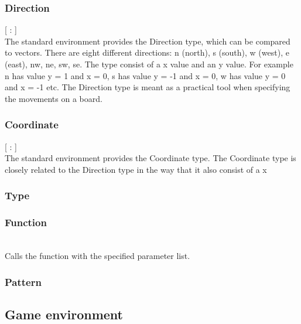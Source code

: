 \subsubsection{Direction}
\begin{dlist}
  \item {}[ : ]\\
  The standard environment provides the Direction type, which can be compared to vectors. There are eight different directions: n (north), s (south), w (west), e (east), nw, ne, sw, se. The type consist of a x value and an y value. For example n has value y = 1 and x = 0, s has value y = -1 and x = 0, w has value y = 0 and x = -1 etc. The Direction type is meant as a practical tool when specifying the movements on a board.  
\end{dlist}

\subsubsection{Coordinate}
\begin{dlist}
  \item {}[ : ]\\
  The standard environment provides the Coordinate type. The Coordinate type is closely related to the Direction type in the way that it also consist of a x 
\end{dlist}
\subsubsection{Type}

\subsubsection{Function}

\begin{dlist}
  \item {}\\
    Calls the function with the specified parameter list. 
\end{dlist}

\subsubsection{Pattern}

\subsection{Game environment}
\label{sec:gameenvironment}

